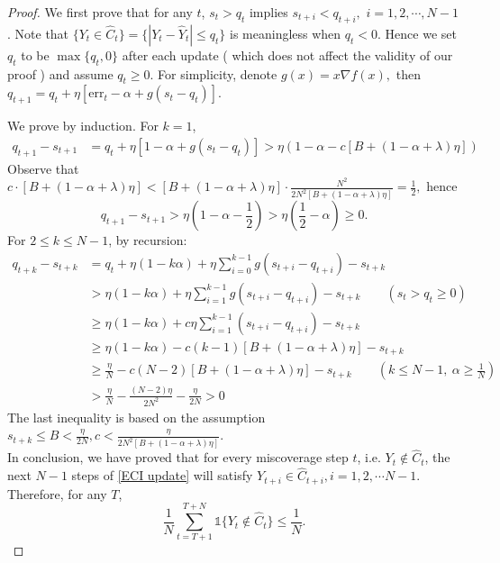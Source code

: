 \begin{proof}
    We first prove that for any $t$, $s_t>q_t$ implies $s_{t+i}<q_{t+i},$  $i=1,2,\cdots, N-1$. Note that $\{Y_t \in \hat{C}_t\}=\{|Y_t-\hat{Y}_t|\leq q_t\}$ is meaningless when $q_t<0$. Hence we set $q_t$ to be $\max\{q_t,0\}$ after each update ( which does not affect the validity of our proof ) and assume $q_t\geq 0$. For simplicity,  denote $g(x)=x \nabla f(x),$ then $q_{t+1}=q_t+\eta 
    \left[\text{err}_t-\alpha+g(s_t-q_t)\right]$.
   
    We prove  by induction. For $k=1$,
    \begin{align*}
        q_{t+1}-s_{t+1}&=q_t+\eta \left[1-\alpha+g(s_t-q_t)\right]>\eta (1-\alpha-c \left[B+(1-\alpha+\lambda)\eta\right]) 
    \end{align*}
    Observe that $c \cdot [B+(1-\alpha+\lambda)\eta]< [B+(1-\alpha+\lambda)\eta]\cdot\frac{N^2}{2N^2\left[B+(1-\alpha+\lambda)\eta\right]}=\frac{1}{2},$ hence $$q_{t+1}-s_{t+1}>\eta(1-\alpha-\frac{1}{2})>\eta(\frac{1}{2}-\alpha)\geq 0.$$
    For $2 \leq k \leq N-1$, by recursion:
     \begin{align*}
         q_{t+k}-s_{t+k}&=q_t+\eta(1-k\alpha)+\eta \sum_{i=0}^{k-1} g(s_{t+i}-q_{t+i})-s_{t+k}\\
         & >\eta(1-k\alpha)+\eta \sum_{i=1}^{k-1} g(s_{t+i}-q_{t+i})-s_{t+k} \qquad (  s_t>q_t\geq 0)
         \\ 
         & \geq \eta(1-k\alpha)+c\eta \sum_{i=1}^{k-1} (s_{t+i}-q_{t+i})-s_{t+k}
         \\
         & \geq \eta(1-k\alpha)-c(k-1)\left[B+(1-\alpha+\lambda)\eta\right]-s_{t+k} \\
         & \geq \frac{\eta}{N}-c(N-2)\left[B+(1-\alpha+\lambda)\eta\right]-s_{t+k} \qquad (k\leq N-1, \ \alpha\geq \frac{1}{N} ) \\
         &>\frac{\eta}{N}-\frac{(N-2)\eta}{2N^2}-\frac{\eta}{2N}>0
    \end{align*}
    The last inequality is based on the assumption  $s_{t+k}\leq B <\frac{\eta}{2N}, c<\frac{\eta}{2N^2\left[B+(1-\alpha+\lambda)\eta\right]}$. \\
   
    In conclusion, we have proved that for every miscoverage step $t$, i.e. $Y_t \notin \hat{C}_t$, the next $N-1$ steps of \eqref{ECI update} will satisfy  $Y_{t+i} \in \hat{C}_{t+i}, i=1,2,\cdots N-1$. Therefore, for any $T$,  
     $$ \frac{1}{N}\sum_{t=T+1}^{T+N} \mathds{1}\{Y_t \notin \hat{C}_t\}\leq \frac{1}{N}.$$
\end{proof}

